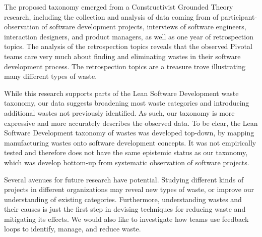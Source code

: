 The proposed taxonomy emerged from a Constructivist Grounded Theory research, including the collection and analysis of data coming from \durationOfResearchStudyPlural{} of participant-observation of  \numberOfObservedProjects{} software development projects, interviews of \numberOfInterviews{} software engineers, interaction designers, and product managers, as well as one year of retrospection topics. The analysis of the retrospection topics reveals that the observed Pivotal teams care very much about finding and eliminating wastes in their software development process. The retrospection topics are a treasure trove illustrating many different types of waste. 

While this research supports parts of the Lean Software Development waste taxonomy, our data suggests broadening most waste categories and introducing additional wastes not previously identified. As such, our taxonomy is more expressive and more accurately describes the observed data. To be clear, the Lean Software Development taxonomy of wastes was developed top-down, by mapping manufacturing wastes onto software development concepts. It was not empirically tested and therefore does not have the same epistemic status as our taxonomy, which was develop bottom-up from systematic observation of software projects. 


Several avenues for future research have potential. Studying different kinds of projects in different organizations may reveal new types of waste, or improve our understanding of existing categories. Furthermore, understanding wastes and their causes is just the first step in devising techniques for reducing waste and mitigating its effects. We would also like to investigate how teams use feedback loops to identify, manage, and reduce waste. 




